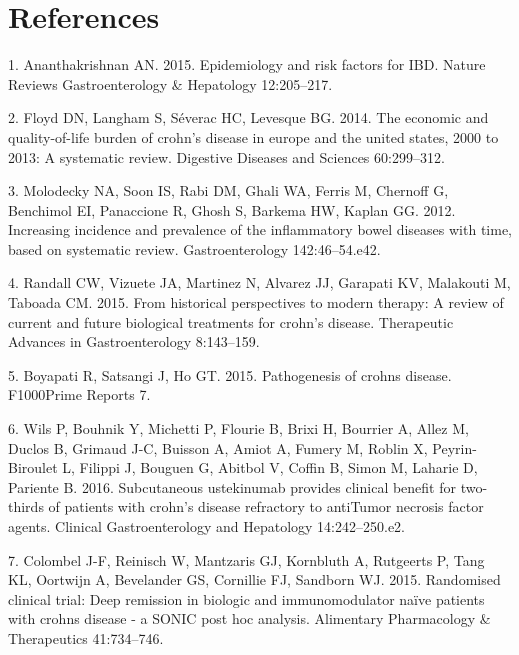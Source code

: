 \documentclass[11pt,]{article}
\begin{document}
\newpage

\section*{References}\label{references}

\hypertarget{refs}{}
\hypertarget{ref-Ananthakrishnan_2015}{}
1. Ananthakrishnan AN. 2015. Epidemiology and risk factors for IBD.
Nature Reviews Gastroenterology \& Hepatology 12:205--217.

\hypertarget{ref-Floyd_2014}{}
2. Floyd DN, Langham S, Séverac HC, Levesque BG. 2014. The economic and
quality-of-life burden of crohn's disease in europe and the united
states, 2000 to 2013: A systematic review. Digestive Diseases and
Sciences 60:299--312.

\hypertarget{ref-Molodecky_2012}{}
3. Molodecky NA, Soon IS, Rabi DM, Ghali WA, Ferris M, Chernoff G,
Benchimol EI, Panaccione R, Ghosh S, Barkema HW, Kaplan GG. 2012.
Increasing incidence and prevalence of the inflammatory bowel diseases
with time, based on systematic review. Gastroenterology 142:46--54.e42.

\hypertarget{ref-Randall_2015}{}
4. Randall CW, Vizuete JA, Martinez N, Alvarez JJ, Garapati KV,
Malakouti M, Taboada CM. 2015. From historical perspectives to modern
therapy: A review of current and future biological treatments for
crohn's disease. Therapeutic Advances in Gastroenterology 8:143--159.

\hypertarget{ref-Boyapati_2015}{}
5. Boyapati R, Satsangi J, Ho GT. 2015. Pathogenesis of crohns disease.
F1000Prime Reports 7.

\hypertarget{ref-Wils_2016}{}
6. Wils P, Bouhnik Y, Michetti P, Flourie B, Brixi H, Bourrier A, Allez
M, Duclos B, Grimaud J-C, Buisson A, Amiot A, Fumery M, Roblin X,
Peyrin-Biroulet L, Filippi J, Bouguen G, Abitbol V, Coffin B, Simon M,
Laharie D, Pariente B. 2016. Subcutaneous ustekinumab provides clinical
benefit for two-thirds of patients with crohn's disease refractory to
antiTumor necrosis factor agents. Clinical Gastroenterology and
Hepatology 14:242--250.e2.

\hypertarget{ref-Colombel_2015}{}
7. Colombel J-F, Reinisch W, Mantzaris GJ, Kornbluth A, Rutgeerts P,
Tang KL, Oortwijn A, Bevelander GS, Cornillie FJ, Sandborn WJ. 2015.
Randomised clinical trial: Deep remission in biologic and
immunomodulator naïve patients with crohns disease - a SONIC post hoc
analysis. Alimentary Pharmacology \& Therapeutics 41:734--746.
\end{document}
